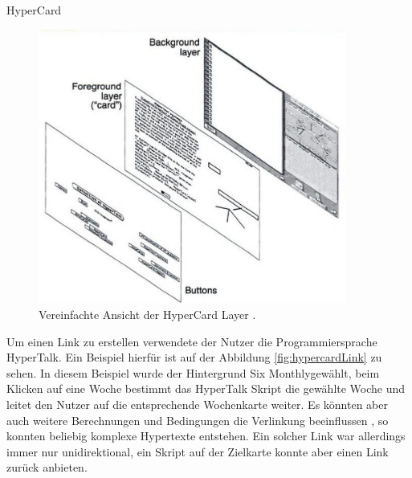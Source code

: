 \begin{section}{HyperCard}
\begin{figure}[H]
	\centering
	\includegraphics[width=0.9\textwidth]{image/layer}
	\caption{Vereinfachte Ansicht der HyperCard Layer \cite{Nielsen1995}.}
	\label{fig:layer}
\end{figure}

Um einen Link zu erstellen verwendete der Nutzer die Programmiersprache HyperTalk. Ein Beispiel hierfür ist auf der Abbildung \ref{fig:hypercardLink} zu sehen. In diesem Beispiel wurde der Hintergrund \glqq Six Monthly\grqq{ }gewählt, beim Klicken auf eine Woche bestimmt das HyperTalk Skript die gewählte Woche und leitet den Nutzer auf die entsprechende Wochenkarte weiter. Es könnten aber auch weitere Berechnungen und Bedingungen die Verlinkung beeinflussen \cite{Goodman1988}, so konnten beliebig komplexe Hypertexte entstehen. Ein solcher Link war allerdings immer nur unidirektional, ein Skript auf der Zielkarte konnte aber einen Link zurück anbieten.


\end{section}
